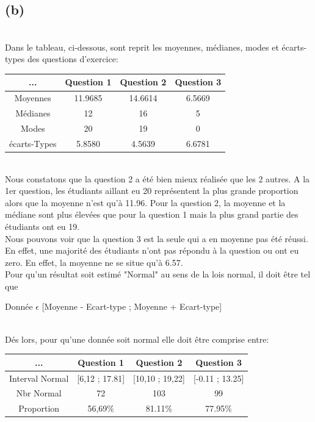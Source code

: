 \documentclass[10pt,a4paper]{article}
\begin{document}
\subsection*{(b)}
\ \\

Dans le tableau, ci-dessous, sont reprit les moyennes, médianes, modes et écarts-types des questions d'exercice:

\begin{center}
\begin{tabular}{|c|c|c|c|}
\hline
... & Question 1 & Question 2 & Question 3 \\
\hline
\hline
Moyennes & 11.9685 & 14.6614 & 6.5669 \\
\hline
Médianes & 12 & 16 & 5 \\
\hline
Modes & 20 & 19 & 0 \\
\hline
écarts-Types & 5.8580 & 4.5639 & 6.6781 \\
\hline

\end{tabular}
\end{center}
\ \\

Nous constatons que la question 2 a été bien mieux réalisée que les 2 autres. A la 1er question, les étudiants aillant eu 20 représentent la plus grande proportion alors que la moyenne n'est qu'à 11.96. Pour la question 2, la moyenne et la médiane sont plus élevées que pour la question 1 mais la plus grand partie des étudiants ont eu 19.
\ \\

Nous pouvons voir que la question 3 est la seule qui a en moyenne pas été réussi. En effet, une majorité des étudiants n'ont pas répondu à la question ou ont eu zero. En effet, la moyenne ne se situe qu'à 6.57. 
\ \\

Pour qu'un résultat soit estimé "Normal" au sens de la lois normal, il doit être tel que

\begin{center}
Donnée $\epsilon$ [Moyenne - Ecart-type ; Moyenne + Ecart-type] 
\end{center}
\ \\

Dés lors, pour qu'une donnée soit normal elle doit être comprise entre:

\begin{center}
\begin{tabular}{|c|c|c|c|}
\hline
... & Question 1 & Question 2 & Question 3 \\
\hline
\hline
Interval Normal & [6,12 ; 17.81] & [10,10 ; 19,22] & [-0.11 ; 13.25] \\
\hline
 Nbr Normal & 72 & 103 & 99 \\
\hline
 Proportion & 56,69\% & 81.11\% & 77.95\% \\
 
\hline
\end{tabular}
\end{center}
\end{document}
